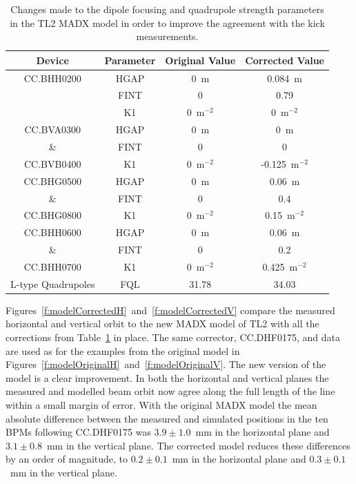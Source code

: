 \begin{table}
  \begin{center}
    \begin{tabular}{|c c c c|}
	    \hline
        Device & Parameter & Original Value & Corrected Value\\ \hline
		CC.BHH0200 & HGAP & 0~m & 0.084~m \\
		 	       & FINT & 0 & 0.79 \\
		           & K1 & 0~\(\mathrm{m^{-2}}\) & 0~\(\mathrm{m^{-2}}\) \\ \hline
		CC.BVA0300   & HGAP & 0~m & 0~m \\
		 	 \&      & FINT & 0 & 0 \\
		CC.BVB0400   & K1 & 0~\(\mathrm{m^{-2}}\) & -0.125~\(\mathrm{m^{-2}}\) \\ \hline
		CC.BHG0500   & HGAP & 0~m & 0.06~m \\
		 	 \&      & FINT & 0 & 0.4 \\
		CC.BHG0800   & K1 & 0~\(\mathrm{m^{-2}}\) & 0.15~\(\mathrm{m^{-2}}\) \\ \hline
		CC.BHH0600   & HGAP & 0~m & 0.06~m \\
		 	 \&      & FINT & 0 & 0.2 \\
		CC.BHH0700   & K1 & 0~\(\mathrm{m^{-2}}\) & 0.425~\(\mathrm{m^{-2}}\) \\ \hline
		L-type Quadrupoles & FQL & 31.78 & 34.03 \\
	   \hline
    \end{tabular}
    \caption{Changes made to the dipole focusing and quadrupole strength parameters in the TL2 MADX model in order to improve the agreement with the kick measurements.}
  	\label{t:tl2ModelChanges}
  \end{center}
\end{table}

Figures~\ref{f:modelCorrectedH}~and~\ref{f:modelCorrectedV} compare the measured horizontal and vertical orbit to the new MADX model of TL2 with all the corrections from Table~\ref{t:tl2ModelChanges} in place. The same corrector, CC.DHF0175, and data are used as for the examples from the original model in Figures~\ref{f:modelOriginalH}~and~\ref{f:modelOriginalV}. The new version of the model is a clear improvement. In both the horizontal and vertical planes the measured and modelled beam orbit now agree along the full length of the line within a small margin of error. With the original MADX model the mean absolute difference between the measured and simulated positions in the ten BPMs following CC.DHF0175 was \(3.9\pm1.0\)~mm in the horizontal plane and \(3.1\pm0.8\)~mm in the vertical plane. The corrected model reduces these differences by an order of magnitude, to \(0.2\pm0.1\)~mm in the horizontal plane and \(0.3\pm0.1\)~mm in the vertical plane.

